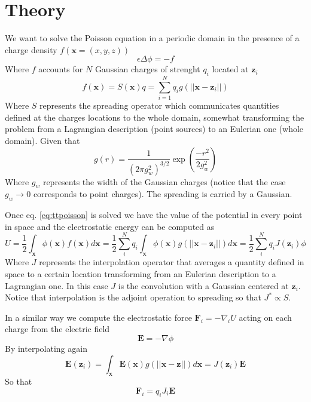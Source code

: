\documentclass[ twoside,openright,titlepage,numbers=noenddot,%
headinclude,footinclude,cleardoublepage=empty,abstract=on,
BCOR=5mm,paper=a4,fontsize=11pt, dvipsnames
]{scrreprt}
\renewcommand{\vec}[1]{\bm{#1}}
\begin{document}
\section{Theory} \label{sec:tppoisson_theory}
We want to solve the Poisson equation in a periodic domain in the presence of a charge density $f(\vec{x}=(x,y,z))$
\begin{equation}
  \label{eq:ttpoisson}
 \epsilon\Delta\phi=-f
\end{equation}
Where $f$ accounts for $N$ Gaussian charges of strenght $q_i$ located at $\vec{z}_i$ 
\begin{equation}
  \label{eq:tppoisson_cdens}
  f(\vec{x})= S(\vec{x})q = \sum_{i=1}^Nq_ig(||\vec{x}-\vec{z}_i||)
\end{equation}
Where $S$ represents the spreading operator which communicates quantities defined at the charges locations to the whole domain, somewhat transforming the problem from a Lagrangian description (point sources) to an Eulerian one (whole domain). Given that
\begin{equation}
  \label{eq:tpppoisson_gaussiansource}
 g(r)=\frac{1}{\left(2\pi g_w^2\right)^{3/2}}\exp{\left(\frac{-r^2}{2g_w^2}\right)}
\end{equation}
Where $g_w$ represents the width of the Gaussian charges (notice that the case $g_w\rightarrow 0$ corresponds to point charges).
The spreading is carried by a Gaussian.

Once eq. \eqref{eq:ttpoisson} is solved we have the value of the potential in every point in space and the electrostatic energy can be computed as
\begin{equation}
  \label{tppoisson_avgpot}
  U = \frac{1}{2}\int_{\vec{x}}{ \phi(\vec{x}) f(\vec{x}) d\vec{x}} = \frac{1}{2}\sum_i^N{q_i\int_{\vec{x}}\phi(\vec{x})g(||\vec{x}-\vec{z}_i||) d\vec{x}} = \frac{1}{2}\sum_i^N{q_iJ(\vec{z}_i)\phi}
\end{equation}
Where $J$ represents the interpolation operator that averages a quantity defined in space to a certain location transforming from an Eulerian description to a Lagrangian one. In this case $J$ is the convolution with a Gaussian centered at $\vec{z}_i$. Notice that interpolation is the adjoint operation to spreading so that $J^{*} \propto S$.

In a similar way we compute the electrostatic force $\vec{F}_i = -\nabla_i{U}$ acting on each charge from the electric field
\begin{equation}
  \vec{E} = -\nabla{\phi} 
\end{equation}
By interpolating again
\begin{equation}
  \label{tppoisson_avgfield}
\vec{E}(\vec{z}_i) = \int_{\vec{x}}{\vec{E}(\vec{x})g(||\vec{x}-\vec{z}||)d\vec{x}} = J(\vec{z}_i)\vec{E} %
\end{equation}
So that
\begin{equation}
\vec{F}_i = q_iJ_i\vec{E}%
\end{equation}
\end{document}
